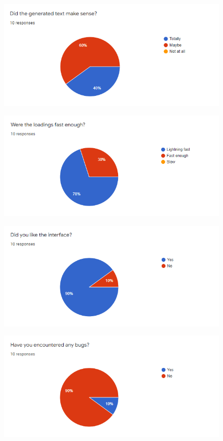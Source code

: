 \documentclass[12pt]{report}
\begin{document}
\begin{appendices}
\paragraph{}

\begin{figure}[ht]
  \centering
  \includegraphics[width=.8\linewidth]{img/feedback0.png}
  \label{fig:feedback0}
\end{figure}
\begin{figure}[ht]
  \centering
  \includegraphics[width=.8\linewidth]{img/feedback1.png}
  \label{fig:feedback1}
\end{figure}
\begin{figure}[ht]
  \centering
  \includegraphics[width=.8\linewidth]{img/feedback2.png}
  \label{fig:feedback2}
\end{figure}
\begin{figure}[ht]
  \centering
  \includegraphics[width=.8\linewidth]{img/feedback3.png}

\end{figure}
\end{appendices}
\end{document}
